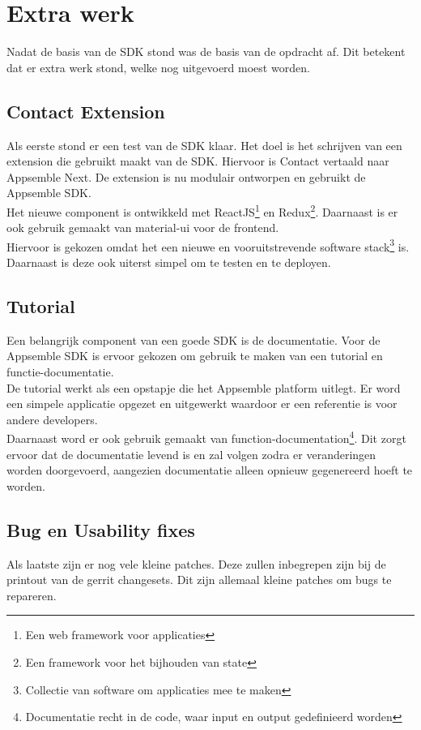 \chapter{Extra werk}

Nadat de basis van de SDK stond was de basis van de opdracht af. Dit betekent dat er extra werk stond, welke nog uitgevoerd moest worden. 

\section{Contact Extension}

Als eerste stond er een test van de SDK klaar. Het doel is het schrijven van een extension die gebruikt maakt van de SDK. Hiervoor is Contact vertaald naar Appsemble Next. De extension is nu modulair ontworpen en gebruikt de Appsemble SDK. \\

Het nieuwe component is ontwikkeld met ReactJS\footnote{Een web framework voor applicaties} en Redux\footnote{Een framework voor het bijhouden van state}. Daarnaast is er ook gebruik gemaakt van material-ui voor de frontend. \\

Hiervoor is gekozen omdat het een nieuwe en vooruitstrevende software stack\footnote{Collectie van software om applicaties mee te maken} is. Daarnaast is deze ook uiterst simpel om te testen en te deployen.

\section{Tutorial}

Een belangrijk component van een goede SDK is de documentatie. Voor de Appsemble SDK is ervoor gekozen om gebruik te maken van een tutorial en functie-documentatie. \\

De tutorial werkt als een opstapje die het Appsemble platform uitlegt. Er word een simpele applicatie opgezet en uitgewerkt waardoor er een referentie is voor andere developers. \\

Daarnaast word er ook gebruik gemaakt van function-documentation\footnote{Documentatie recht in de code, waar input en output gedefinieerd worden}. Dit zorgt ervoor dat de documentatie levend is en zal volgen zodra er veranderingen worden doorgevoerd, aangezien documentatie alleen opnieuw gegenereerd hoeft te worden.

\section{Bug en Usability fixes}

Als laatste zijn er nog vele kleine patches. Deze zullen inbegrepen zijn bij de printout van de gerrit changesets. Dit zijn allemaal kleine patches om bugs te repareren.